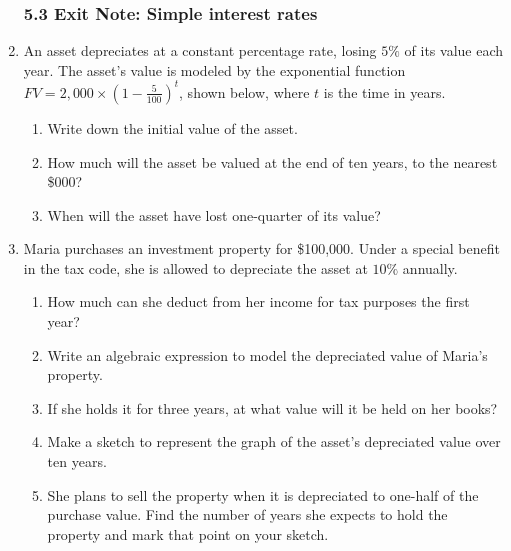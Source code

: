 \documentclass[12pt, twoside]{article}
\begin{document}
\begin{enumerate}
\subsubsection*{5.3 Exit Note: Simple interest rates}
\item An asset depreciates at a constant percentage rate, losing $5\%$ of its value each year. The asset's value is modeled by the exponential function $\displaystyle FV=2,000 \times \left( 1-\frac{5}{100} \right)^t$, shown below, where $t$ is the time in years.
\begin{multicols}{2}
    \begin{enumerate}[itemsep=1cm]
        \item Write down the initial value of the asset.
        \item How much will the asset be valued at the end of ten years, to the nearest \$000?
        \item When will the asset have lost one-quarter of its value?
    \end{enumerate}
    \begin{center}
    \end{center}
    \end{multicols}

\item Maria purchases an investment property for \$100,000. Under a special benefit in the tax code, she is allowed to depreciate the asset at $10\%$ annually. 
\begin{enumerate}[itemsep=1cm]
    \item How much can she deduct from her income for tax purposes the first year?
    \item Write an algebraic expression to model the depreciated value of Maria's property.
    \item If she holds it for three years, at what value will it be held on her books?
    \item Make a sketch to represent the graph of the asset's depreciated value over ten years. \vspace{3cm}
    \item She plans to sell the property when it is depreciated to one-half of the purchase value. Find the number of years she expects to hold the property and mark that point on your sketch.
\end{enumerate}
\vspace{2cm}



\end{enumerate}
\end{document}

